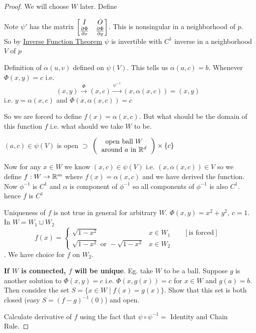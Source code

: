 \begin{proof}
	We will choose $W$ later. Define \begin{center}
	\end{center}
Note $\psi'$ has the matrix $\left[\begin{matrix}I & O\\ \frac{\partial \Phi}{\partial x} & \frac{\partial \Phi}{\partial y}\end{matrix}\right]$. This is nonsingular in a neighborhood of $p$. So by \hyperref[th:invthm]{Inverse Function Theorem} $\psi$ is invertible with $C^1$ inverse in a neighborhood $V$ of $p$
\begin{center}
\end{center}Definition of $\alpha(u,v)$ defined on $\psi(V)$. This tells us $\alpha(a,c)=b$. Whenever $\Phi(x,y)=c$ i.e. $$(x,y)\xrightarrow{\Phi}(x,c)\xrightarrow{\psi^{-1}}(x,\alpha(x,c))=(x,y)$$ i.e. $y=\alpha(x,c)$ and $\Phi(x,\alpha(x,c))=c$

So we are forced to define $f(x)=\alpha(x,c)$. But what should be the domain of this function $f$ i.e. what should we take $W$ to be. 

\begin{center}
	$(a,c)\in \psi(V)$ is open $\supset$ $\lt( \text{\begin{tabular}{c}
		open ball $W$ \\ around $a$ in $\bbR^d$
	\end{tabular}} \rt)\times \{c\} $
\end{center}

Now for any $x\in W$ we know $(x,c)\in \psi(V)$ i.e. $(x,\alpha(x,c))\in V$ so we define $f:W\to \mathbb{R}^m$ where $f(x)=\alpha(x,c)$ and we have derived the function. Now $\phi^{-1}$ is $C^1$ and $\alpha$ is component of $\phi^{-1}$ so all components of $\phi^{-1}$ is also $C^1$. hence $f$ is $C^1$

Uniqueness of $f$ is not true in general for arbitrary $W$. $\Phi(x,y)=x^2+y^2,\ c=1$. In $W=W_1\sqcup W_2$ $$f(x)=\begin{cases}
	\sqrt{1-x^2} & x\in W_1 \qquad[\text{is forced}]\\
	\sqrt{1-x^2} \text{ or }-\sqrt{1-x^2} & x\in W_2
\end{cases}$$. We have choice for $f$ on $W_2$. 

\textbf{If $W$ is connected, $f$ will be unique}. Eg. take $W$ to be a ball.  Suppose $g$ is another solution to $\Phi(x,y)=c$ i.e. $\Phi(x,g(x))=c$ for $x\in W$ and $g(a)=b$. Then consider the set $S=\{x\in W\mid f(x)=g(x)\}$. Show that this set is both closed (easy $S=(f-g)^{-1}(0)$) and open. 


Calculate derivative of $f$ using the fact that $\psi\circ \psi^{-1}=$ Identity and Chain Rule.
\end{proof}
